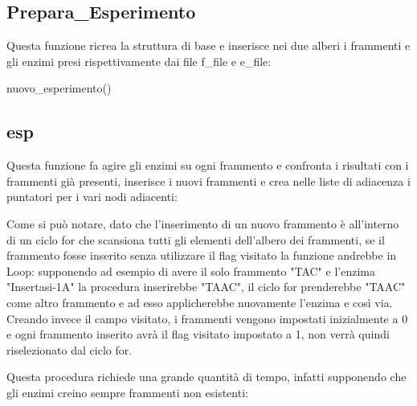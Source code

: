 \documentclass[a4paper,10pt]{article}
\begin{document}
\subsection{Prepara\_{}Esperimento}
Questa funzione ricrea la struttura di base e inserisce nei due alberi i frammenti e gli enzimi presi rispettivamente dai file f\_{}file e e\_{}file:

\begin{algorithm}[H]
nuovo\_{}esperimento()\;


\end{algorithm}
\subsection{esp}\label{sec:esp}
Questa funzione fa agire gli enzimi su ogni frammento e confronta i risultati con i frammenti già presenti, inserisce i nuovi frammenti e crea nelle liste di adiacenza i puntatori per i vari nodi adiacenti:

\begin{algorithm}[H]
\end{algorithm}
Come si può notare, dato che l'inserimento di un nuovo frammento è all'interno di un ciclo for che scansiona tutti gli elementi dell'albero dei frammenti, se il frammento fosse inserito senza utilizzare il flag visitato la funzione andrebbe in Loop: supponendo ad esempio di avere il solo frammento "TAC" e l'enzima "Insertasi-1A" la procedura inserirebbe "TAAC", il ciclo for prenderebbe "TAAC" come altro frammento e ad esso applicherebbe nuovamente l'enzima e così via. Creando invece il campo visitato, i frammenti vengono impostati inizialmente a 0 e ogni frammento inserito avrà il flag visitato impostato a 1, non verrà quindi riselezionato dal ciclo for.

Questa procedura richiede una grande quantità di tempo, infatti supponendo che gli enzimi creino sempre frammenti non esistenti:
\end{document}
